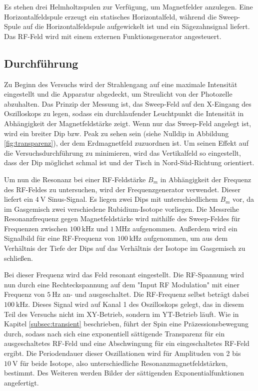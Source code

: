   Es stehen drei Helmholtzspulen zur Verfügung, um Magnetfelder anzulegen. Eine Horizontalfeldspule erzeugt ein statisches Horizontalfeld, während die Sweep-Spule auf die Horizontalfeldspule aufgewickelt ist und ein Sägezahnsignal liefert. Das RF-Feld wird mit einem externen Funktionsgenerator angesteuert.

  \subsection{Durchführung}

  Zu Beginn des Versuchs wird der Strahlengang auf eine maximale Intensität eingestellt und die Apparatur abgedeckt, um Streulicht von der Photozelle abzuhalten.
  Das Prinzip der Messung ist, das Sweep-Feld auf den X-Eingang des Oszilloskops zu legen, sodass ein durchlaufender Leuchtpunkt die Intensität in Abhängigkeit der Magnetfeldstärke zeigt.
  Wenn nur das Sweep-Feld angelegt ist, wird ein breiter Dip bzw. Peak zu sehen sein (siehe Nulldip in Abbildung \ref{fig:transparenz}), der dem Erdmagnetfeld zuzuordnen ist. Um seinen Effekt auf die Versuchsdurchführung zu minimieren, wird das Vertikalfeld so eingestellt, dass der Dip möglichst schmal ist und der Tisch in Nord-Süd-Richtung orientiert.

  Um nun die Resonanz bei einer RF-Feldstärke $B_m$ in Abhängigkeit der Frequenz des RF-Feldes zu untersuchen, wird der Frequenzgenerator verwendet. Dieser liefert ein $\SI{4}{\volt}$ Sinus-Signal. Es liegen zwei Dips mit unterschiedlichem $B_m$ vor, da im Gasgemisch zwei verschiedene Rubidium-Isotope vorliegen. Die Messreihe Resonanzfrequenz gegen Magnetfeldstärke wird mithilfe des Sweep-Feldes für Frequenzen zwischen $\SI{100}{\kilo\hertz}$ und $\SI{1}{\mega\hertz}$ aufgenommen.
  Außerdem wird ein Signalbild für eine RF-Frequenz von $\SI{100}{\kilo\hertz}$ aufgenommen, um aus dem Verhältnis der Tiefe der Dips auf das Verhältnis der Isotope im Gasgemisch zu schließen.

  Bei dieser Frequenz wird das Feld resonant eingestellt. Die RF-Spannung wird nun durch eine Rechteckspannung auf dem "Input RF Modulation" mit einer Frequenz von $\SI{5}{\hertz}$ an- und ausgeschaltet. Die RF-Frequenz selbst beträgt dabei $\SI{100}{\kilo\hertz}$. Dieses Signal wird auf Kanal 1 des Oszilloskops gelegt, das in diesem Teil des Versuchs nicht im XY-Betrieb, sondern im YT-Betrieb läuft. Wie in Kapitel \ref{subsec:transient} beschrieben, führt der Spin eine Präzessionsbewegung durch, sodass nach sich eine exponentiell sättigende Transparenz für ein ausgeschaltetes RF-Feld und eine Abschwingung für ein eingeschaltetes RF-Feld ergibt. Die Periodendauer dieser Oszillationen wird für Amplituden von 2 bis $\SI{10}{\volt}$ für beide Isotope, also unterschiedliche Resonanzmagnetfeldstärken, bestimmt.
  Des Weiteren werden Bilder der sättigenden Exponentialfunktionen angefertigt.
